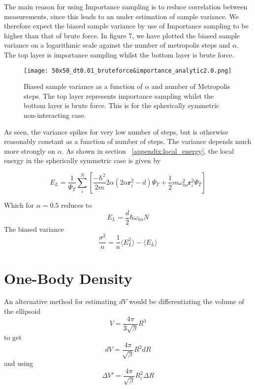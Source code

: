 \documentclass[
    a4paper, aps, twocolumn, floatfix, superscriptaddress,
    nofootinbib]{revtex4-1}
\begin{document}
\begin{appendices}
The main reason for using Importance sampling is to reduce correlation between measurements, since this leads to an under estimation of sample variance. We therefore expect the biased sample variance by use of Importance sampling to be higher than that of brute force. In figure 7, we have plotted the biased sample variance on a logarithmic scale against the number of metropolis steps and $\alpha$. The top layer is importance sampling whilst the bottom layer is brute force.

\begin{figure}[H]
    \centering
    \texttt{[image: 50x50\_dt0.01\_bruteforce\&importance\_analytic2.0.png]}
    \caption{Biased sample variance as a function of $\alpha$ and number of Metropolis steps. The top layer represents importance sampling whilst the bottom layer is brute force. This is for the spherically symmetric non-interacting case. }
    \label{fig:blocking_behaviour}
\end{figure}

As seen, the variance spikes for very low number of steps, but is otherwise reasonably constant as a function of number of steps. The variance depends much more strongly on $\alpha$. As shown in section ~\ref{appendix:local_energy}, the local energy in the spherically symmetric case is given by

\begin{equation}
    E_L = \frac{1}{\Psi_T} \sum_i^N \left[\frac{-\hbar^2}{2m} 2\alpha(2\alpha \boldsymbol{r}_i^2 - d) \Psi_T + \frac{1}{2}m \omega_{ho}^2 \boldsymbol{r}_i^2 \Psi_T\right]
\end{equation}

Which for $\alpha = 0.5$ reduces to
\begin{equation}
    E_L = \frac{d}{2} \hbar \omega_{ho} N
\end{equation}
The biased variance 
\begin{equation}
    \frac{\sigma^2}{n} = \frac{1}{n} \langle E_L^2 \rangle - \langle E_L \rangle 
\end{equation}

\section{One-Body Density}
An alternative method for estimating $dV$ would be differentiating the volume of the ellipsoid
\begin{equation}
    V = \frac{4\pi}{3\sqrt{\beta}}R^3
\end{equation}
to get
\begin{equation}
    dV = \frac{4\pi}{\sqrt{\beta}}R^2 dR
\end{equation}
and using
\begin{equation}
    \Delta V' = \frac{4\pi}{\sqrt{\beta}}R_i^2 \Delta R
\end{equation}



\end{appendices}
\end{document}
